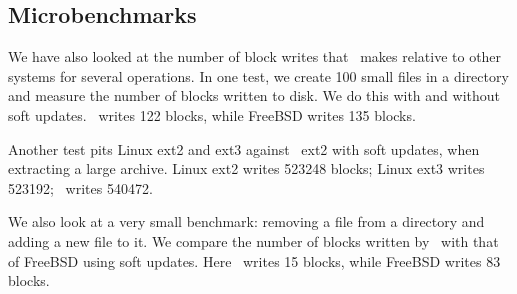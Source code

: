 \begin{comment}
\begin{figure}[htb]
\centering
\texttt{[image: opts-patches]}
\texttt{[image: opts-rollback]}
\begin{tabular}{|l|r|r|} \hline
Optimization & Untar (sys sec) & Delete (sys sec) \\ \hline\hline
None & 4.42 & 1.14 \\ \hline\hline
\Nrb\ \Chdescs{} & 4.53 & 1.08 \\ \hline
Overlap Merge & 3.58 & 0.85 \\ \hline\hline
HP $+$ OM & 3.58 & 0.75 \\ \hline
\end{tabular}
\caption{Effects of \nrb\ \chdescs\ with \nrb\ merging and overlap
merging for the untar and rm tests.}
\label{fig:opts}
\end{figure}
\end{comment}

\begin{comment}
\begin{figure}[htb]
\vspace{-0.5\baselineskip}
\centering{
\texttt{[image: rb\_chdesc\_size]}
}
\vspace{-0.5\baselineskip}
\caption{\label{fig:patchsize-histo} \Rb\ \chdesc\ size histogram for a sample
workload (extracting a large archive into ext2). All the \chdescs\ larger than
63 bytes have been optimized into \nrb\ \chdescs. \Rb\ \chdescs\ 4 bytes and
smaller account for about 51\% of all \rb\ \chdescs.}
\end{figure}
\end{comment}

\subsection {Microbenchmarks}
We have also looked at the number of block writes that \Kudos\ makes
relative to other systems for several operations. In one test, we
create 100 small files in a directory and measure the number of blocks
written to disk. We do this with and without soft updates. \Kudos\
writes 122 blocks, while FreeBSD writes 135 blocks.

Another test pits Linux ext2 and ext3 against \Kudos\ ext2 with soft updates,
when extracting a large archive. Linux ext2 writes 523248 blocks; Linux ext3
writes 523192; \Kudos\ writes 540472.

We also look at a very small benchmark: removing a file from a
directory and adding a new file to it. We compare the number of blocks
written by \Kudos\ with that of FreeBSD using soft updates. Here
\Kudos\ writes 15 blocks, while FreeBSD writes 83 blocks.

